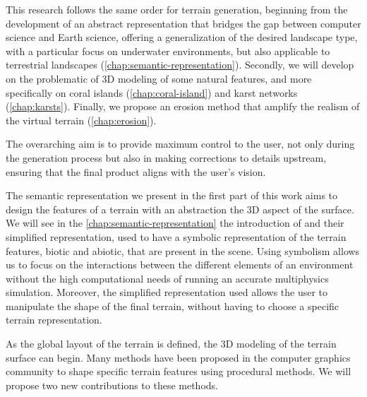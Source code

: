 This research follows the same order for terrain generation, beginning from the development of an abstract representation that bridges the gap between computer science and Earth science, offering a generalization of the desired landscape type, with a particular focus on underwater environments, but also applicable to terrestrial landscapes (\cref{chap:semantic-representation}). Secondly, we will develop on the problematic of 3D modeling of some natural features, and more specifically on coral islands (\cref{chap:coral-island}) and karst networks (\cref{chap:karsts}). Finally, we propose an erosion method that amplify the realism of the virtual terrain (\cref{chap:erosion}).

The overarching aim is to provide maximum control to the user, not only during the generation process but also in making corrections to details upstream, ensuring that the final product aligns with the user's vision.

The semantic representation we present in the first part of this work aims to design the features of a terrain with an abstraction the 3D aspect of the surface. We will see in the \cref{chap:semantic-representation} the introduction of  and their simplified representation, used to have a symbolic representation of the terrain features, biotic and abiotic, that are present in the scene. Using symbolism allows us to focus on the interactions between the different elements of an environment without the high computational needs of running an accurate multiphysics simulation. Moreover, the simplified representation used allows the user to manipulate the shape of the final terrain, without having to choose a specific terrain representation.

As the global layout of the terrain is defined, the 3D modeling of the terrain surface can begin. Many methods have been proposed in the computer graphics community to shape specific terrain features using procedural methods. We will propose two new contributions to these methods. 

